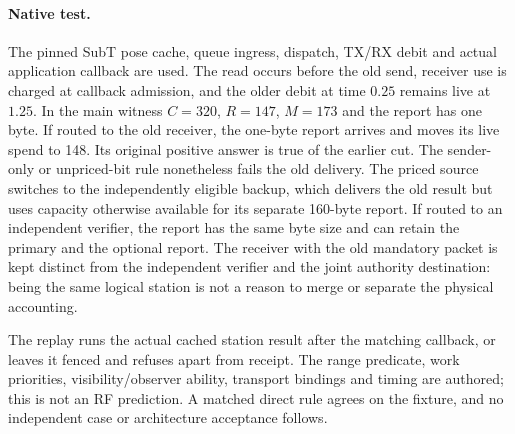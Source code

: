 \documentclass{article}
\begin{document}
\paragraph{Native test.}
The pinned SubT pose cache, queue ingress, dispatch, TX/RX debit
and actual application callback are used. The read occurs before
the old send, receiver use is charged at callback admission, and the
older debit at time $0.25$ remains live at $1.25$. In the main
witness $C=320$, $R=147$, $M=173$ and the report has one byte.
If routed to the old receiver, the one-byte report arrives and moves
its live spend to 148. Its original positive answer is true of the
earlier cut. The sender-only or unpriced-bit rule nonetheless fails
the old delivery. The priced source switches to the independently
eligible backup, which delivers the old result but uses capacity
otherwise available for its separate 160-byte report. If routed
to an independent verifier, the report has the same byte size and
can retain the primary and the optional report. The receiver with
the old mandatory packet is kept distinct from the independent
verifier and the joint authority destination: being the same logical
station is not a reason to merge or separate the physical accounting.

The replay runs the actual cached station result after the matching
callback, or leaves it fenced and refuses apart from receipt. The
range predicate, work priorities, visibility/observer ability,
transport bindings and timing are authored; this is not an RF
prediction. A matched direct rule agrees on the fixture, and no
independent case or architecture acceptance follows.
\end{document}
